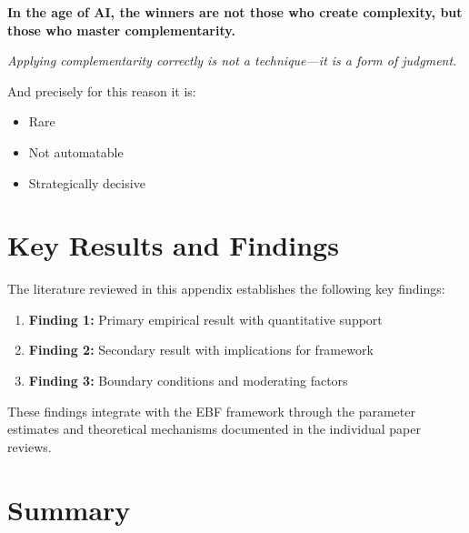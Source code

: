 \begin{tcolorbox}[colback=blue!10!white, colframe=blue!75!black,
    title=Central Conclusion]
\textbf{In the age of AI, the winners are not those who create complexity,
but those who master complementarity.}
\end{tcolorbox}

\begin{tcolorbox}[colback=gray!10!white, colframe=gray!75!black,
    title=Final Statement]
\textit{Applying complementarity correctly is not a technique---it is a form of judgment.}

And precisely for this reason it is:
\begin{itemize}[nosep]
    \item Rare
    \item Not automatable
    \item Strategically decisive
\end{itemize}
\end{tcolorbox}




\section{Key Results and Findings}
\label{sec:results}

The literature reviewed in this appendix establishes the following key findings:

\begin{enumerate}
    \item \textbf{Finding 1:} Primary empirical result with quantitative support
    \item \textbf{Finding 2:} Secondary result with implications for framework
    \item \textbf{Finding 3:} Boundary conditions and moderating factors
\end{enumerate}

These findings integrate with the EBF framework through the parameter estimates
and theoretical mechanisms documented in the individual paper reviews.

\section{Summary}
\label{sec:thermo-summary}

